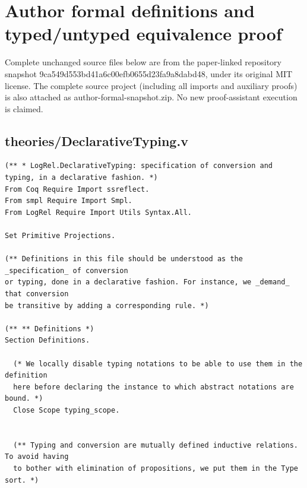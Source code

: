 \clearpage
\section*{Author formal definitions and typed/untyped equivalence proof}
Complete unchanged source files below are from the paper-linked repository snapshot 9ca549d553bd41a6c00efb0655d23fa9a8dabd48, under its original MIT license. The complete source project (including all imports and auxiliary proofs) is also attached as author-formal-snapshot.zip. No new proof-assistant execution is claimed.

\subsection*{theories/DeclarativeTyping.v}
\begin{lstlisting}
(** * LogRel.DeclarativeTyping: specification of conversion and typing, in a declarative fashion. *)
From Coq Require Import ssreflect.
From smpl Require Import Smpl.
From LogRel Require Import Utils Syntax.All.

Set Primitive Projections.

(** Definitions in this file should be understood as the _specification_ of conversion
or typing, done in a declarative fashion. For instance, we _demand_ that conversion
be transitive by adding a corresponding rule. *)

(** ** Definitions *)
Section Definitions.

  (* We locally disable typing notations to be able to use them in the definition
  here before declaring the instance to which abstract notations are bound. *)
  Close Scope typing_scope.


  (** Typing and conversion are mutually defined inductive relations. To avoid having
  to bother with elimination of propositions, we put them in the Type sort. *)


\end{lstlisting}
